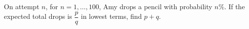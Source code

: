 On attempt $n$, for $n=1,\ldots,100$, Amy drops a pencil with probability $n\%$. If the expected total drops is $\dfrac{p}{q}$ in lowest terms, find $p+q$.
